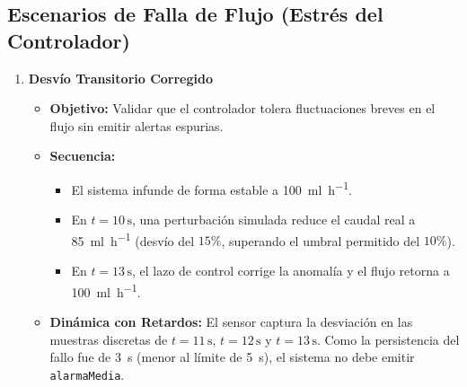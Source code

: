 \documentclass[11pt,a4paper]{article}
\begin{document}
\subsection{Escenarios de Falla de Flujo (Estrés del Controlador)}

\begin{enumerate}[label=\textbf{Escenario \arabic*:}, startingvalue=3, leftmargin=*]
    \item \textbf{Desvío Transitorio Corregido}
    \begin{itemize}
        \item \textbf{Objetivo:} Validar que el controlador tolera fluctuaciones breves en el flujo sin emitir alertas espurias.
        \item \textbf{Secuencia:}
        \begin{itemize}
            \item El sistema infunde de forma estable a \SI{100}{\ml\per\hour}.
            \item En $t = 10\,\text{s}$, una perturbación simulada reduce el caudal real a \SI{85}{\ml\per\hour} (desvío del $15\%$, superando el umbral permitido del $10\%$).
            \item En $t = 13\,\text{s}$, el lazo de control corrige la anomalía y el flujo retorna a \SI{100}{\ml\per\hour}.
        \end{itemize}
        \item \textbf{Dinámica con Retardos:} El sensor captura la desviación en las muestras discretas de $t = 11\,\text{s}$, $t = 12\,\text{s}$ y $t = 13\,\text{s} $. Como la persistencia del fallo fue de \SI{3}{\second} (menor al límite de \SI{5}{\second}), el sistema no debe emitir \texttt{alarmaMedia}.
    \end{itemize}


\end{enumerate}
\end{document}
